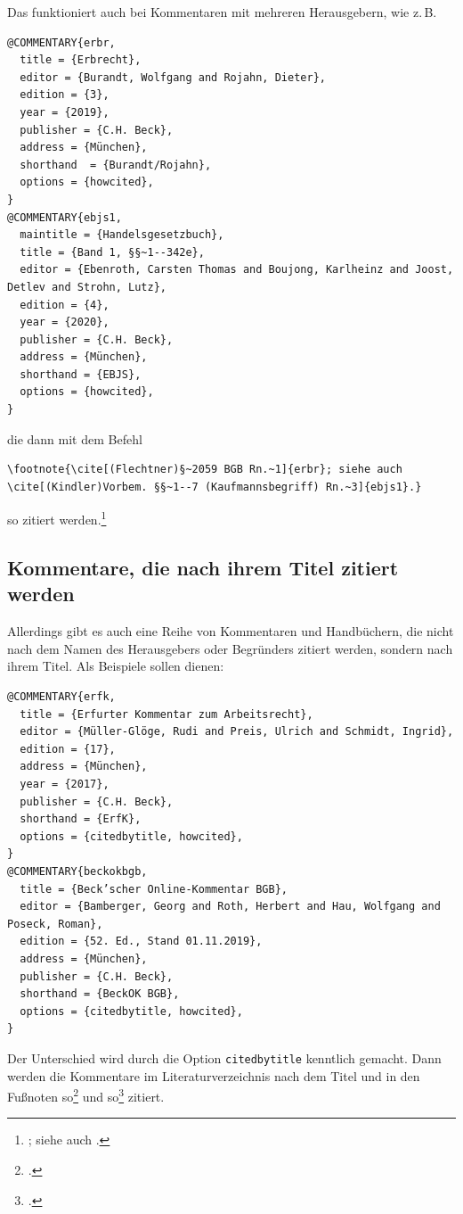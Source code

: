 \documentclass[headings=small,numbers=noenddot, 12pt,oneside]{scrartcl}
\begin{document}
Das funktioniert auch bei Kommentaren mit mehreren Herausgebern, wie z.\,B.
\begin{verbatim}
@COMMENTARY{erbr,
  title = {Erbrecht},
  editor = {Burandt, Wolfgang and Rojahn, Dieter},
  edition = {3},
  year = {2019},
  publisher = {C.H. Beck},
  address = {München},
  shorthand  = {Burandt/Rojahn},   
  options = {howcited},
}  
@COMMENTARY{ebjs1,
  maintitle = {Handelsgesetzbuch},
  title = {Band 1, §§~1--342e},
  editor = {Ebenroth, Carsten Thomas and Boujong, Karlheinz and Joost, Detlev and Strohn, Lutz},
  edition = {4},
  year = {2020},
  publisher = {C.H. Beck},
  address = {München},
  shorthand = {EBJS},   
  options = {howcited},
}  
\end{verbatim}
die dann mit dem Befehl
\begin{verbatim}
\footnote{\cite[(Flechtner)§~2059 BGB Rn.~1]{erbr}; siehe auch \cite[(Kindler)Vorbem. §§~1--7 (Kaufmannsbegriff) Rn.~3]{ebjs1}.}
\end{verbatim}
so zitiert werden.\footnote{\cite[(Flechtner)§~2059 BGB Rn.~1]{erbr}; siehe auch \cite[(Kindler)Vorbem. §§~1--7 (Kaufmannsbegriff) Rn.~3]{ebjs1}.} 

\subsection{Kommentare, die nach ihrem Titel zitiert werden}
Allerdings gibt es auch eine Reihe von Kommentaren und Handbüchern, die nicht nach dem Namen des Herausgebers oder Begründers zitiert werden, sondern nach ihrem Titel. Als Beispiele sollen dienen: 
\begin{verbatim}
@COMMENTARY{erfk,
  title = {Erfurter Kommentar zum Arbeitsrecht},
  editor = {Müller-Glöge, Rudi and Preis, Ulrich and Schmidt, Ingrid},
  edition = {17},
  address = {München},
  year = {2017},
  publisher = {C.H. Beck},
  shorthand = {ErfK},
  options = {citedbytitle, howcited},
}
@COMMENTARY{beckokbgb,
  title = {Beck’scher Online-Kommentar BGB},
  editor = {Bamberger, Georg and Roth, Herbert and Hau, Wolfgang and Poseck, Roman},
  edition = {52. Ed., Stand 01.11.2019},
  address = {München},
  publisher = {C.H. Beck},
  shorthand = {BeckOK BGB},
  options = {citedbytitle, howcited},
}
\end{verbatim}
Der Unterschied wird durch die Option \texttt{citedbytitle} kenntlich gemacht. Dann werden die Kommentare im Literaturverzeichnis nach dem Titel und in den Fußnoten so\footcite[(Oetker)§~15 AktG Rn.~3]{erfk} und so\footcite[(Faust)§~433 Rn.~1]{beckokbgb} zitiert.
\end{document}
